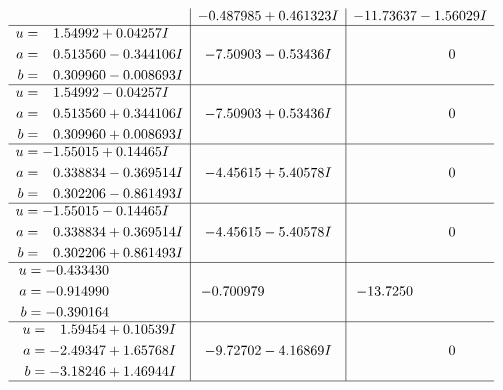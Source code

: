 \documentclass[1p]{elsarticle_modified}
\theoremstyle{definition}
\begin{document}
$$\begin{array}{c|c|c}
 & -0.487985 + 0.461323 I & -11.73637 - 1.56029 I \\ \hline\begin{aligned}
u &= \phantom{-}1.54992 + 0.04257 I \\
a &= \phantom{-}0.513560 - 0.344106 I \\
b &= \phantom{-}0.309960 - 0.008693 I\end{aligned}
 & -7.50903 - 0.53436 I & \phantom{-0.000000 } 0 \\ \hline\begin{aligned}
u &= \phantom{-}1.54992 - 0.04257 I \\
a &= \phantom{-}0.513560 + 0.344106 I \\
b &= \phantom{-}0.309960 + 0.008693 I\end{aligned}
 & -7.50903 + 0.53436 I & \phantom{-0.000000 } 0 \\ \hline\begin{aligned}
u &= -1.55015 + 0.14465 I \\
a &= \phantom{-}0.338834 - 0.369514 I \\
b &= \phantom{-}0.302206 - 0.861493 I\end{aligned}
 & -4.45615 + 5.40578 I & \phantom{-0.000000 } 0 \\ \hline\begin{aligned}
u &= -1.55015 - 0.14465 I \\
a &= \phantom{-}0.338834 + 0.369514 I \\
b &= \phantom{-}0.302206 + 0.861493 I\end{aligned}
 & -4.45615 - 5.40578 I & \phantom{-0.000000 } 0 \\ \hline\begin{aligned}
u &= -0.433430\phantom{ +0.000000I} \\
a &= -0.914990\phantom{ +0.000000I} \\
b &= -0.390164\phantom{ +0.000000I}\end{aligned}
 & -0.700979\phantom{ +0.000000I} & -13.7250\phantom{ +0.000000I} \\ \hline\begin{aligned}
u &= \phantom{-}1.59454 + 0.10539 I \\
a &= -2.49347 + 1.65768 I \\
b &= -3.18246 + 1.46944 I\end{aligned}
 & -9.72702 - 4.16869 I & \phantom{-0.000000 } 0\\
 \hline 
 \end{array}$$\newpage$$\begin{array}{c|c|c}  

\end{array}$$
\end{document}
